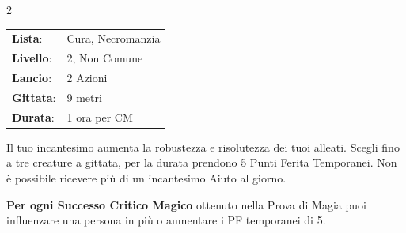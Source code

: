 \begin{multicols}{2}




\noindent\begin{tabularx}{\linewidth}{p{1.9cm}X}
	\rowcolor{gray!20}\textbf{Lista}: & Cura, Necromanzia \\
	\textbf{Livello}: & 2, Non Comune \\
	\rowcolor{gray!20}\textbf{Lancio}: & 2 Azioni \\
	\textbf{Gittata}: & 9 metri \\
	\rowcolor{gray!20}\textbf{Durata}: & 1 ora per CM \\
\end{tabularx}\smallskip


Il tuo incantesimo aumenta la robustezza e risolutezza dei tuoi alleati. Scegli fino a tre creature a gittata, per la durata prendono 5 Punti Ferita Temporanei. Non è possibile ricevere più di un incantesimo Aiuto al giorno.

\textbf{Per ogni Successo Critico Magico} ottenuto nella Prova di Magia puoi influenzare una persona in più o aumentare i PF temporanei di 5.


\end{multicols}

